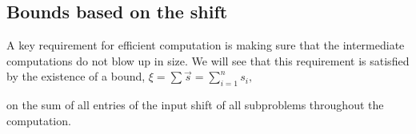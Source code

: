 \subsection{\label{sub:boundsBasedOnShift}Bounds based on the shift}

A key requirement for efficient computation is making sure that the
intermediate computations do not blow up in size. We will see that
this requirement is satisfied by the existence of a bound, $\xi=\sum\vec{s}=\sum_{i=1}^{n}{s}_{i},$
\begin{comment}
the sum of all entries of the initial input shift $\vec{s}$, 
\end{comment}
{} on the sum of all entries of the input shift of all subproblems throughout
the computation.%
\begin{comment}
, as we will see later in \prettyref{lem:boundOfSumOfShiftedDegreesOfOrderBasis},
\prettyref{thm:boundOfSumOfShiftedDegreesOfKernelBasis}, and \prettyref{lem:boundOnShiftedDegrees}
that this quantity bounds the sum of all entries of the input shift
of all subproblems throughout the computation,. 
\end{comment}
{} 



